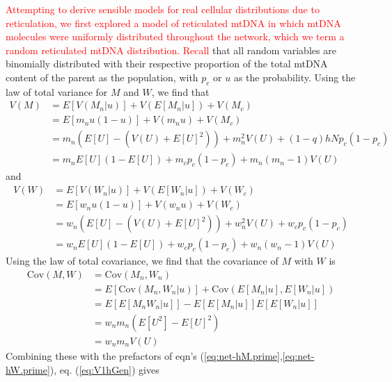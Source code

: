 \documentclass{article}
\begin{document}
\begin{appendices}
\textcolor{red}{Attempting to derive sensible models for real cellular distributions due to reticulation, we first explored a model of reticulated mtDNA in which mtDNA molecules were uniformly distributed throughout the network, which we term a random reticulated mtDNA distribution. Recall} that all random variables are binomially distributed with their respective proportion of the total mtDNA content of the parent as the population, with $p_c$ or $u$ as the probability. Using the law of total variance for $M$ and $W$, we find that
\begin{equation}\label{eq:VarM_NetStoch}
    \begin{split}
   V(M) & = E[V(M_n|u)]+V(E[M_n|u])+V(M_c)\\
        & = E[m_nu(1-u)]+V(m_nu)+V(M_c)\\
        & = m_n(E[U]-(V(U)+E[U]^2))+m_n^2V(U)+(1-q)hNp_c(1-p_c)\\
        & = m_nE[U](1-E[U])+m_cp_c(1-p_c)+m_n(m_n-1)V(U)
    \end{split}
\end{equation}
and
\begin{equation}\label{eq:VarW_NetStoch}
    \begin{split}
   V(W) & = E[V(W_n|u)]+V(E[W_n|u])+V(W_c)\\
        & = E[w_nu(1-u)]+V(w_nu)+V(W_c)\\
        & = w_n(E[U]-(V(U)+E[U]^2))+w_n^2V(U)+w_cp_c(1-p_c)\\
        & = w_nE[U](1-E[U])+w_cp_c(1-p_c)+w_n(w_n-1)V(U)
    \end{split}
\end{equation}
Using the law of total covariance, we find that the covariance of $M$ with $W$ is
\begin{equation}\label{eq:CovMW_NetStoch}
    \begin{split}
  \mathrm{Cov}(M,W) & = \mathrm{Cov}(M_n,W_n) \\
    & = E[\mathrm{Cov}(M_n,W_n|u)]+\mathrm{Cov}(E[M_n|u],E[W_n|u])\\ 
    & = E[E[M_nW_n|u]]-E[E[M_n|u]]E[E[W_n|u]]\\
    & = w_nm_n(E[U^2]-E[U]^2)\\
    & = w_nm_nV(U)
    \end{split}
\end{equation}
Combining these with the prefactors of eqn's (\ref{eq:net-hM.prime},\ref{eq:net-hW.prime}), eq. (\ref{eq:V1hGen}) gives
\begin{equation}\label{eq:var-h-net-no-repel}

\end{equation}
\end{appendices}
\end{document}
